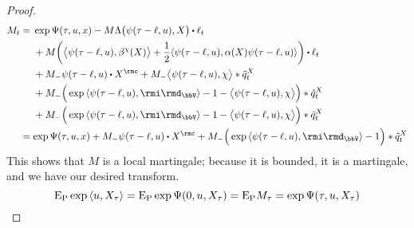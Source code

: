 \begin{proof}
\begin{align*}
    M_t 
    &= \begin{aligned}[t]
      &\exp\aff(\tau, \momentVar, \stateVar) 
      - M \ode\big(\affPart(\tau-\leb, \momentVar), \X\big) \shortInt \leb_t \\
      &+ M \bigg( \bprj{\affPart(\tau-\leb, \momentVar)}{\affDrift^\trunc(\X)} + \frac12 \prj{\affPart(\tau-\leb,\momentVar)}{\affDiff(\X)\affPart(\tau-\leb,\momentVar)} \bigg) \shortInt \leb_t \\
      &+ M_- \affPart(\tau-\leb, \momentVar) \shortInt \X^\rmc
      + M_- \bprj{\affPart(\tau-\leb,\momentVar)}{\trunc} \ast \compensate{\jumpMeas^\X}_t \\
      &+ M_- \Big( \exp\prj{\affPart(\tau-\leb,\momentVar)}{\id_\vecSpace} - 1 - \bprj{\affPart(\tau-\leb,\momentVar)}{\trunc} \Big) \ast \predproj{\jumpMeas^\X}_t \\
      &+ M_- \Big( \exp\prj{\affPart(\tau-\leb,\momentVar)}{\id_\vecSpace} - 1 - \bprj{\affPart(\tau-\leb,\momentVar)}{\trunc} \Big) \ast \compensate{\jumpMeas^\X}_t 
    \end{aligned} \\
    &= \exp\aff(\tau, \momentVar, \stateVar) 
      + M_- \affPart(\tau-\leb, \momentVar) \shortInt \X^\rmc
      + M_- \Big( \exp\prj{\affPart(\tau-\leb,\momentVar)}{\id_\vecSpace} - 1 \Big) \ast \compensate{\jumpMeas^\X}_t 
  \end{align*}
  This shows that $M$ is a local martingale; because it is bounded, it is a martingale, and we have our desired transform.
  \begin{equation*}
    {\operatorname{E}}_{\operatorname{P}} \exp{\langle u, X_\tau \rangle} = {\operatorname{E}}_{\operatorname{P}} \exp\Psi(0, u, X_\tau) = {\operatorname{E}}_{\operatorname{P}} M_\tau = \exp\Psi(\tau, u, X_\tau)
  \end{equation*}
\end{proof}
